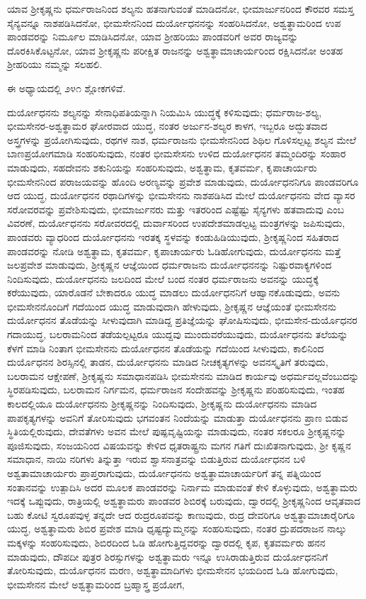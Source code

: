 ಯಾವ ಶ‍್ರೀಕೃಷ್ಣನು ಧರ್ಮರಾಜನಿಂದ ಶಲ್ಯನು ಹತನಾಗುವಂತೆ ಮಾಡಿದನೋ, ಭೀಮಾರ್ಜುನರಿಂದ ಕೌರವರ ಸಮಸ್ತ ಸೈನ್ಯವನ್ನೂ ನಾಶಪಡಿಸಿದನೋ, ಭೀಮಸೇನನಿಂದ ದುರ್ಯೋಧನನನ್ನು ಸಂಹರಿಸಿದನೋ, ಅಶ್ವತ್ಥಾಮರಿಂದ ಉಪ ಪಾಂಡವರನ್ನು ನಿರ್ಮೂಲ ಮಾಡಿಸಿದನೋ, ಯಾವ ಶ‍್ರೀಹರಿಯು ಪಾಂಡವರಿಗೆ ಅವರ ರಾಜ್ಯವನ್ನು ದೊರಕಿಸಿಕೊಟ್ಟನೋ, ಯಾವ ಶ‍್ರೀಕೃಷ್ಣನು ಪರೀಕ್ಷಿತ ರಾಜನನ್ನು ಅಶ್ವತ್ಥಾಮಾಚಾರ್ಯರಿಂದ ರಕ್ಷಿಸಿದನೋ ಅಂತಹ ಶ‍್ರೀಹರಿಯು ನಮ್ಮನ್ನು ಸಲಹಲಿ.

ಈ ಅಧ್ಯಾಯದಲ್ಲಿ ೨೪೧ ಶ್ಲೋಕಗಳಿವೆ.

ದುರ್ಯೋಧನನು ಶಲ್ಯನನ್ನು ಸೇನಾಧಿಪತಿಯನ್ನಾಗಿ ನಿಯಮಿಸಿ ಯುದ್ಧಕ್ಕೆ ಕಳಿಸುವುದು; ಧರ್ಮರಾಜ-ಶಲ್ಯ, ಭೀಮಸೇನರ-ಅಶ್ವತ್ಥಾಮರ ಘೋರವಾದ ಯುದ್ಧ, ನಂತರ ಅರ್ಜುನ-ಶಲ್ಯರ ಕಾಳಗ, ಇಬ್ಬರೂ ಅದ್ಭುತವಾದ ಅಸ್ತ್ರಗಳನ್ನು ಪ್ರಯೋಗಿಸುವುದು, ರಥಗಳ ನಾಶ, ಧರ್ಮರಾಜನು ಭೀಮಸೇನನಿಂದ ಶಿಥಿಲ ಗೊಳಿಸಲ್ಪಟ್ಟ ಶಲ್ಯನ ಮೇಲೆ ಬಾಣಪ್ರಯೋಗಮಾಡಿ ಸಂಹರಿಸುವುದು, ನಂತರ ಭೀಮಸೇಸನು ಉಳಿದ ದುರ್ಯೋಧನನ ತಮ್ಮಂದಿರನ್ನು ಸಂಹಾರ ಮಾಡುವುದು, ಸಹದೇವನು ಶಕುನಿಯನ್ನು ಸಂಹರಿಸುವುದು, ಅಶ್ವತ್ಥಾಮ, ಕೃತವರ್ಮ, ಕೃಪಾಚಾರ್ಯರು ಭೀಮಸೇನನಿಂದ ಪರಾಜಯವನ್ನು ಹೊಂದಿ ಅರಣ್ಯವನ್ನು ಪ್ರವೇಶ ಮಾಡುವುದು, ದುರ್ಯೋಧನನಿಗೂ ಪಾಂಡವರಿಗೂ ಆದ ಯುದ್ಧ, ದುರ್ಯೋಧನನ ರಥಾದಿಗಳನ್ನು ಭೀಮಸೇನನು ನಾಶಪಡಿಸಿದ ಮೇಲೆ ದುರ್ಯೋಧನನು ವೇದ ವ್ಯಾಸರ ಸರೋವರವನ್ನು ಪ್ರವೇಶಿಸುವುದು, ಭೀಮಾರ್ಜುನರು ಮತ್ತು ಇತರರಿಂದ ಎಷ್ಟೆಷ್ಟು ಸೈನ್ಯಗಳು ಹತವಾದುವು ಎಂಬ ವಿವರಣೆ, ದುರ್ಯೋಧನನು ಸರೋವರದಲ್ಲಿ ದುರ್ವಾಸರಿಂದ ಉಪದೇಶಮಾಡಲ್ಪಟ್ಟ ಮಂತ್ರಗಳನ್ನು ಜಪಿಸುವುದು, ಪಾಂಡವರು ವ್ಯಾಧರಿಂದ ದುರ್ಯೋಧನನು ಇರತಕ್ಕ ಸ್ಥಳವನ್ನು ಕಂಡುಹಿಡಿಯುವುದು, ಶ‍್ರೀಕೃಷ್ಣನಿಂದ ಸಹಿತರಾದ ಪಾಂಡವರನ್ನು ನೋಡಿ ಅಶ್ವತ್ಥಾಮ, ಕೃತವರ್ಮ, ಕೃಪಾಚಾರ್ಯರು ಓಡಿಹೋಗುವುದು, ದುರ್ಯೋಧನನು ಮತ್ತೆ ಜಲಪ್ರವೇಶ ಮಾಡುವುದು, ಶ‍್ರೀಕೃಷ್ಣನ ಆಜ್ಞೆಯಿಂದ ಧರ್ಮರಾಜನು ದುರ್ಯೋಧನನನ್ನು ನಿಷ್ಟುರವಾಕ್ಯಗಳಿಂದ ನಿಂದಿಸುವುದು, ದುರ್ಯೋಧನನು ಜಲದಿಂದ ಮೇಲೆ ಬಂದ ನಂತರ ಧರ್ಮರಾಜನು ಅವನನ್ನು ಯುದ್ಧಕ್ಕೆ ಕರೆಯುವುದು, ಯಾರೊಡನೆ ಬೇಕಾದರೂ ಯುದ್ಧ ಮಾಡಲು ದುರ್ಯೋಧನನಿಗೆ ಆಹ್ವಾನಕೊಡುವುದು, ಅವನು ಭೀಮಸೇನನೊಂದಿಗೆ ಗದೆಯಿಂದ ಯುದ್ಧ ಮಾಡುವುದಾಗಿ ಹೇಳುವುದು, ಶ‍್ರೀಕೃಷ್ಣನ ಆಜ್ಞೆಯಂತೆ ಭೀಮಸೇನನು ದುರ್ಯೋಧನನ ತೊಡೆಯನ್ನು ಸೀಳುವುದಾಗಿ ಮಾಡಿದ್ದ ಪ್ರತಿಜ್ಞೆಯನ್ನು ಘೋಷಿಸುವುದು, ಭೀಮಸೇನ-ದುರ್ಯೊಧನರ ಗದಾಯುದ್ಧ, ಬಲರಾಮನಿಂದ ತಡೆಯಲ್ಪಟ್ಟರೂ ಯುದ್ದವು ಮುಂದುವರೆಯುವುದು, ದುರ್ಯೋಧನನು ತಲೆಯನ್ನು ಕೆಳಗೆ ಮಾಡಿ ನಿಂತಾಗ ಭೀಮಸೇನನು ದುರ್ಯೋಧನನ ತೊಡೆಯನ್ನು ಗದೆಯಿಂದ ಸೀಳುವುದು, ಕಾಲಿನಿಂದ ದುರ್ಯೊಧನನ ಶಿರಸ್ಸಿನಲ್ಲಿ ತಾಡನ, ದುರ್ಯೋಧನನು ಮಾಡಿದ ನೀಚಕೃತ್ಯಗಳನ್ನು ಅವನಸ್ಕೃತಿಗೆ ತರುವುದು, ಬಲರಾಮನ ಆಕ್ಷೇಪಣೆ, ಶ‍್ರೀಕೃಷ್ಣನು ಸಮಾಧಾನಪಡಿಸಿ ಭೀಮಸೇನನು ಮಾಡಿದ ಕಾರ್ಯವು ಅಧರ್ಮವಲ್ಲವೆಂಬುದನ್ನು ಸ್ಥಿರಪಡಿಸುವುದು, ಬಲರಾಮನ ನಿರ್ಗಮನ, ಧರ್ಮರಾಜನ ಸಂದೇಹವನ್ನು ಶ‍್ರೀಕೃಷ್ಣನು ಪರಿಹರಿಸುವುದು, ಇಂತಹ ಕಾಲದಲ್ಲಿಯೂ ದುರ್ಯೋಧನನು ಶ‍್ರೀಕೃಷ್ಣನನ್ನು ನಿಂದಿಸುವುದು, ಶ‍್ರೀಕೃಷ್ಣನು ದುರ್ಯೋಧನನು ಮಾಡಿದ ಪಾಪಕೃತ್ಯಗಳನ್ನು ಅವನಿಗೆ ತೋರಿಸುವುದು ಭಗವಂತನ ನಿಂದೆಯನ್ನು ಮಾಡುತ್ತಾ ದುರ್ಯೋಧನನು ಪ್ರಾಣ ಬಿಡುವ ಸ್ಥಿತಿಯಲ್ಲಿರುವುದು, ದೇವತೆಗಳು ಅವನ ಮೇಲೆ ಪುಷ್ಪವೃಷ್ಟಿಯನ್ನು ಮಾಡುವುದು, ನಂತರ ಸಕಲರೂ ಶ‍್ರೀಕೃಷ್ಣನನ್ನು ಪೂಜಿಸುವುದು, ಸಂಜಯನಿಂದ ವಿಷಯವನ್ನು ಕೇಳಿದ ಧೃತರಾಷ್ಟ್ರನು ಮಗನ ಗತಿಗೆ ದುಃಖಿತನಾಗುವುದು, ಶ‍್ರೀ ಕೃಷ್ಣನ ಸಮಾಧಾನ, ನಾಯಿ ನರಿಗಳು ತಿನ್ನುತ್ತಾ ಇರುವ ಶ್ವಾಸನಾತ್ರವನ್ನು ಬಿಡುತ್ತಿರುವ ದುರ್ಯೋಧನನ ಬಳಿ ಅಶ್ವತಾಮಾಚಾರ್ಯರು ಪ್ರಾಪ್ತರಾಗುವುದು, ದುರ್ಯೋಧನನು ಅಶ್ವತ್ಥಾಮಾಚಾರ್ಯರಿಗೆ ತನ್ನ ಪತ್ನಿಯಿಂದ ಸಂತಾನವನ್ನು ಉತ್ಪಾದಿಸಿ ಅದರ ಮೂಲಕ ಪಾಂಡವರನ್ನು ನಿರ್ನಾಮ ಮಾಡುವಂತೆ ಕೇಳಿ ಕೊಳ್ಳುವುದು, ಅಶ್ವತ್ಥಾಮರು ಇದಕ್ಕೆ ಒಪ್ಪುವುದು, ರಾತ್ರಿಯಲ್ಲಿ ಅಶ್ವತ್ಥಾಮರು ಪಾಂಡವರ ಶಿಬಿರಕ್ಕೆ ಬರುವುದು, ದ್ವಾರದಲ್ಲಿ ಶ‍್ರೀಕೃಷ್ಣನಿಂದ ಆವೃತವಾದ ಬಹು ಕೋಟಿ ಸ್ವರೂಪವುಳ್ಳ ತನ್ನದೇ ಆದ ರುದ್ರರೂಪವನ್ನು ಕಾಣುವುದು, ರುದ್ರ ದೇವರಿಗೂ ಅಶ್ವತ್ಥಾಮಾಚಾರೈರಿಗೂ ಯುದ್ಧ, ಅಶ್ವತ್ಥಾಮರು ಶಿಬಿರ ಪ್ರವೇಶ ಮಾಡಿ ಧೃಷ್ಟದ್ಯುಮ್ಮನನ್ನು ಸಂಹರಿಸುವುದು, ನಂತರ ದ್ರುಪದರಾಜನ ನಾಲ್ಕು ಮಕ್ಕಳನ್ನು ಸಂಹರಿಸುವುದು, ಶಿಬಿರದಿಂದ ಓಡಿ ಹೋಗುತ್ತಿದ್ದವರನ್ನು ದ್ವಾರದಲ್ಲಿ ಕೃಪ, ಕೃತವರ್ಮರು ಹನನ ಮಾಡುವುದು, ದೌಪದೀ ಪುತ್ರರ ಶಿರಸ್ಸುಗಳನ್ನು ಅಶ್ವತ್ಥಾಮರು ಇನ್ನೂ ಉಸಿರಾಡುತ್ತಿರುವ ದುರ್ಯೋಧನನಿಗೆ ತೋರಿಸುವುದು, ದುರ್ಯೊಧನನ ಮರಣ, ಅಶ್ವತ್ಥಾಮಾದಿಗಳು ಭೀಮಸೇನನ ಭಯದಿಂದ ಓಡಿ ಹೋಗುವುದು, ಭೀಮಸೇನನ ಮೇಲೆ ಅಶ್ವತ್ಥಾಮರಿಂದ ಬ್ರಹ್ಮಾಸ್ತ್ರ ಪ್ರಯೋಗ, 